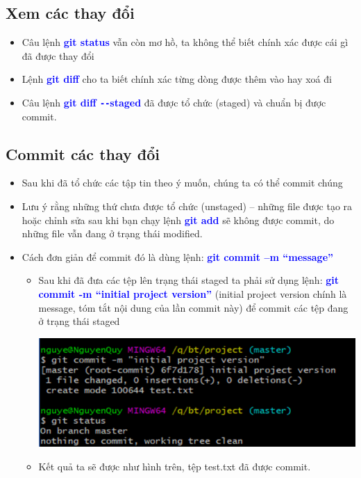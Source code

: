 \documentclass[12pt,a4paper]{report}
\begin{document}
\subsection{Xem các thay đổi} 
\begin{itemize}
\item Câu lệnh \textcolor{blue}{\bf git status} vẫn còn mơ hồ, ta không thể biết chính xác được cái gì đã được thay đổi
\item Lệnh \textcolor{blue}{\bf git diff} cho ta biết chính xác từng dòng được thêm vào hay xoá đi
\item Câu lệnh \textcolor{blue}{\bf git diff \texttt{-{}-}staged} đã được tổ chức (staged) và chuẩn bị được commit.
\end{itemize}
\subsection{Commit các thay đổi}
\begin{itemize}
\item Sau khi đã tổ chức các tập tin theo ý muốn, chúng ta có thể commit chúng
\item Lưu ý rằng những thứ chưa được tổ chức (unstaged) – những file được tạo ra hoặc chỉnh sửa sau khi bạn chạy lệnh \textcolor{blue}{\bf git add} sẽ không được commit, do những file vẫn đang ở trạng thái modified.
\item Cách đơn giản để commit đó là dùng lệnh: \textcolor{blue}{\bf git commit –m “message”}
	\begin{itemize}
	\item Sau khi đã đưa các tệp lên trạng thái staged ta phải sử dụng lệnh: \textcolor{blue}{\bf git commit -m “initial project version”} (initial project version chính là message, tóm tắt nội dung của lần commit này) để commit các tệp đang ở trạng thái staged

	\includegraphics[width=0.8\linewidth]{screenshot012}

	\label{fig:screenshot012}

	\item Kết quả ta sẽ được như hình trên, tệp test.txt đã được commit.
\end{itemize}
\end{itemize}
\end{document}
